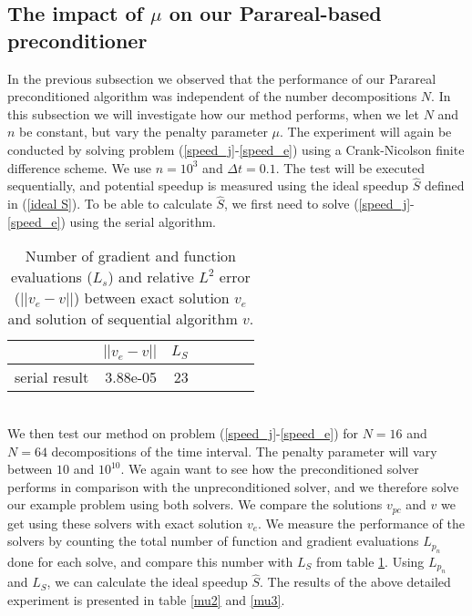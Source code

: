 \subsection{The impact of $\mu$ on our Parareal-based preconditioner}
In the previous subsection we observed that the performance of our Parareal preconditioned algorithm was independent of the number decompositions $N$. In this subsection we will investigate how our method performs, when we let $N$ and $n$ be constant, but vary the penalty parameter $\mu$. The experiment will again be conducted by solving problem (\ref{speed_j}-\ref{speed_e}) using a Crank-Nicolson finite difference scheme. We use $n=10^3$ and $\Delta t=0.1$. The test will be executed sequentially, and potential speedup is measured using the ideal speedup $\hat S$ defined in (\ref{ideal S}). To be able to calculate $\hat S$, we first need to solve (\ref{speed_j}-\ref{speed_e}) using the serial algorithm.
\\ 
\begin{table}[h]
\centering
\caption{Number of gradient and function evaluations ($L_s$) and relative $L^2$ error ($||v_e-v||$) between exact solution $v_e$ and solution of sequential algorithm $v$.} \label{mu1}
\begin{tabular}{lrrllrr}
\toprule
{}  &  $||v_e-v||$  &  $L_S$  \\
\midrule
serial result  &     3.88e-05 &   23    \\
\bottomrule
\end{tabular}
\end{table}
\\
We then test our method on problem (\ref{speed_j}-\ref{speed_e}) for $N=16$ and $N=64$ decompositions of the time interval. The penalty parameter will vary between $10$ and $10^10$. We again want to see how the preconditioned solver performs in comparison with the unpreconditioned solver, and we therefore solve our example problem using both solvers. We compare the solutions $v_{pc}$ and $v$ we get using these solvers with exact solution $v_e$. We measure the performance of the solvers by counting the total number of function and gradient evaluations $L_{p_n}$ done for each solve, and compare this number with $L_S$ from table \ref{mu1}. Using $L_{p_n}$ and $L_S$, we can calculate the ideal speedup $\hat S$. The results of the above detailed experiment is presented in table \ref{mu2} and \ref{mu3}.
\\
